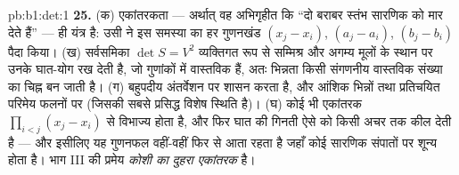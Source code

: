 \begin{solution}{pb:b1:det:1}
\textbf{25.} (क) एकांतरकता --- अर्थात् वह अभिगृहीत कि ``दो बराबर स्तंभ
सारणिक को मार देते हैं'' --- ही यंत्र है: उसी ने इस समस्या का हर गुणनखंड
$(x_j - x_i)$, $(a_j - a_i)$, $(b_j - b_i)$ पैदा किया। (ख) सर्वसमिका $\det S
= V^2$ व्यक्तिगत रूप से सम्मिश्र और अगम्य मूलों के स्थान पर उनके घात-योग रख
देती है, जो गुणांकों में वास्तविक  हैं, अतः भिन्नता किसी संगणनीय
वास्तविक संख्या का चिह्न बन जाती है। (ग)  बहुपदीय अंतर्वेशन
पर शासन करता है, और  आंशिक भिन्नों तथा प्रतिचयित परिमेय फलनों पर
(जिसकी सबसे प्रसिद्ध विशेष स्थिति  है)। (घ) कोई भी एकांतरक
 $\prod_{i<j}(x_j - x_i)$ से विभाज्य होता है, और फिर घात की गिनती ऐसे
 को किसी अचर तक कील देती है --- और इसीलिए यह गुणनफल वहीं-वहीं फिर से
आता रहता है जहाँ कोई सारणिक संपातों पर शून्य होता है। भाग III की प्रमेय
\emph{कोशी का दुहरा एकांतरक} है।
\end{solution}
